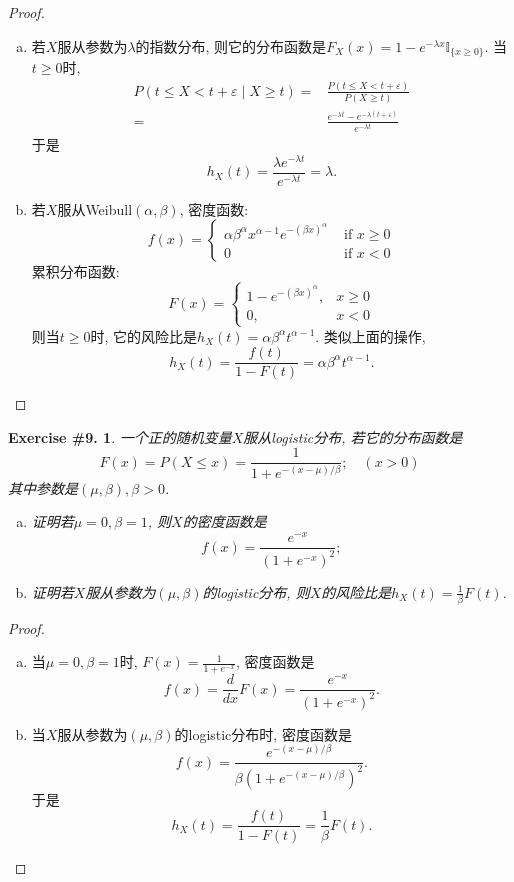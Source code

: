 \documentclass[UTF8, a4paper]{article}
\newtheorem{exercise}{Exercise \#9.}
\begin{document}
\begin{proof}
\begin{enumerate}[a)]
    \item 若\(X\)服从参数为\(\lambda\)的指数分布, 则它的分布函数是\(F_X(x) = 1 - e^{-\lambda x} \mathbb{I}_{\{x\geq 0\}}\). 当\(t\geq 0\)时, $$
    \begin{aligned}
        P(t\leq X < t+\varepsilon \mid X \geq t) =&\frac{P(t \leq X < t + \varepsilon)}{P(X \geq t)} \\
        =&  \frac{e^{-\lambda t} - e^{-\lambda (t+ \varepsilon)}}{e^{-\lambda t}} 
    \end{aligned}
    $$
    于是 
    $$
    h_X(t) = \frac{\lambda e^{-\lambda t}}{e^{-\lambda t}} = \lambda.
    $$
    \item 若\(X\)服从Weibull\((\alpha, \beta)\), 
    密度函数:$$
f(x)= \begin{cases}\alpha \beta^\alpha x^{\alpha-1} e^{-(\beta x)^\alpha} & \text { if } x \geq 0 \\ 0 & \text { if } x<0\end{cases}
$$累积分布函数:
$$
F(x)= \begin{cases}1-e^{-(\beta x)^\alpha}, & x \geq 0 \\ 0, & x<0\end{cases}
$$
    则当\(t\geq 0\)时, 它的风险比是\(h_X(t) = \alpha \beta^\alpha t^{\alpha - 1}\). 类似上面的操作, $$
    h_X(t) = \frac{f(t)}{1-F(t)} = \alpha \beta^\alpha t^{\alpha - 1}.
    $$
\end{enumerate}
\end{proof}


\begin{framed}
\begin{exercise}
一个正的随机变量\(X\)服从logistic分布, 若它的分布函数是
$$
F(x)=P(X \leq x)=\frac{1}{1+e^{-(x-\mu) / \beta}} ; \quad(x>0)
$$
其中参数是\((\mu, \beta), \beta > 0\).
\begin{enumerate}[a)]
    \item 证明若\(\mu = 0, \beta = 1\), 则\(X\)的密度函数是$$
f(x)=\frac{e^{-x}}{\left(1+e^{-x}\right)^2};
$$
    \item 证明若\(X\)服从参数为\((\mu, \beta)\)的logistic分布, 则\(X\)的风险比是\(h_X(t) = \frac{1}{\beta}F(t)\).
\end{enumerate}
\end{exercise}
\end{framed}

\begin{proof}
\begin{enumerate}[a)]
    \item 当\(\mu = 0, \beta = 1\)时, \(F(x) = \frac{1}{1+e^{-x}}\), 密度函数是$$
    f(x) = \frac{d}{dx}F(x) = \frac{e^{-x}}{\left(1+e^{-x}\right)^2}.
    $$
    \item 当\(X\)服从参数为\((\mu, \beta)\)的logistic分布时, 密度函数是$$
    f(x) = \frac{e^{-(x-\mu)/\beta}}{\beta\left(1+e^{-(x-\mu)/\beta}\right)^2}.
    $$于是$$
    h_X(t) = \frac{f(t)}{1-F(t)} = \frac{1}{\beta}F(t).
    $$
\end{enumerate}
\end{proof}




\end{document}
